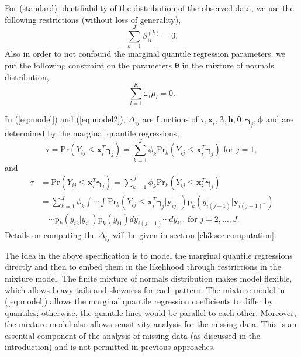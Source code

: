 \documentclass[useAMS,usenatbib,referee]{biom}
\newcommand{\pr}{\mbox{p}}
\newcommand{\prob}{\mbox{Pr}}
\begin{document}
For (standard) identifiability of the distribution of the observed data, we use the
following restrictions (without loss of generality),
\begin{displaymath}
 \sum_{k=1}^J \beta_{1l}^{(k)} = 0.
\end{displaymath}
Also in order to not confound the marginal quantile regression parameters,
we put the following constraint on the parameters $\bm \theta$ in the mixture of normals distribution,
\begin{displaymath}
\sum_{l= 1}^K \omega_{l}\mu_{l} = 0.
\end{displaymath}

In (\ref{eq:model}) and (\ref{eq:model2}), $\Delta_{ij}$ are functions of $\tau, \bm x_{i},
\bm \beta, \bm h, \bm \theta, \bm \gamma_j, \bm \phi$ and are determined by the marginal
quantile regressions,
\begin{equation}
  \label{eq:deltaeqn1}
  \tau = \prob (Y_{ij} \leq \bm x_{i}^T \bm \gamma_j ) = \sum_{k=1}^J
  \phi_k\prob_k (Y_{ij} \leq \bm x_{i}^T \bm \gamma_j ) \mbox{  for  } j = 1,
\end{equation}
and
\begin{align}\label{eq:deltaeqn2}
  \tau &= \prob (Y_{ij} \leq \bm x_{i}^{T} \bm \gamma_j ) =
  \sum_{k=1}^J
  \phi_k\prob_k (Y_{ij} \leq \bm x_{i}^{T} \bm \gamma_j ) \\
  & = \sum_{k=1}^J \phi_k \int\cdots \int \prob_k (Y_{ij} \leq \bm
  x_{i}^{T} \bm \gamma_j | \bm y_{ij^{-}}
  ) \pr_k (y_{i(j-1)}| \bm y_{i(j-1)^{-}})  \nonumber \\
  & \quad \cdots \pr_k (y_{i2}| y_{i1}) \pr_k(y_{i1})
  dy_{i(j-1)}\cdots dy_{i1}.  \mbox{  for  } j = 2, \ldots, J .\nonumber
\end{align}
Details on computing the $\Delta_{ij}$ will be given in section
\ref{ch3:sec:computation}.

The idea in the above specification is to model the marginal quantile regressions directly and then to embed them in the likelihood through restrictions in the mixture model.
The finite mixture of normals distribution makes model flexible, which allows heavy tails and skewness for each pattern.
The mixture model in (\ref{eq:model}) allows the marginal quantile regression coefficients to differ by quantiles; otherwise, the quantile lines would be parallel to each other.
Moreover, the mixture model also allows sensitivity analysis for the missing data.
This is an essential component of the analysis of missing data (as discussed in the introduction) and is not permitted in previous approaches.
\end{document}

